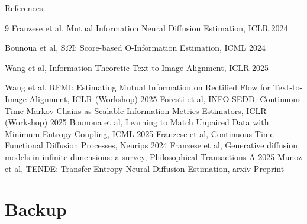 \documentclass[10pt]{beamer}
\begin{document}






\begin{frame}[allowframebreaks]{References}

\begin{thebibliography}{9}
Franzese et al, Mutual Information Neural Diffusion Estimation, ICLR 2024

Bounoua et al, S$\Omega$I: Score-based O-Information Estimation, ICML 2024

Wang et al, Information Theoretic Text-to-Image Alignment, ICLR 2025

Wang et al, RFMI: Estimating Mutual Information on Rectified Flow for Text-to-Image Alignment, ICLR (Workshop) 2025
 Foresti et al, INFO-SEDD: Continuous Time Markov Chains as Scalable Information Metrics Estimators, ICLR (Workshop) 2025
 Bounoua et al, Learning to Match Unpaired Data with Minimum Entropy Coupling, ICML 2025
Franzese et al, Continuous Time Functional Diffusion Processes, Neurips 2024
Franzese et al, Generative diffusion models in infinite dimensions: a survey, Philosophical Transactions A 2025
Munoz et al, TENDE: Transfer Entropy Neural Diffusion Estimation, arxiv Preprint 


\end{thebibliography}
\end{frame}
\part{Backup}






%
\end{document}
